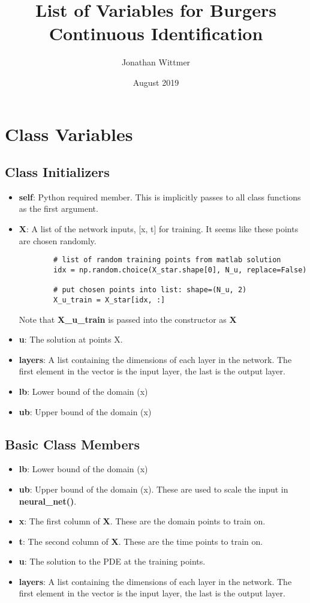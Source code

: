 \documentclass[10pt]{article}
\title{List of Variables for Burgers Continuous Identification}
\author{Jonathan Wittmer}
\date{August 2019}
\begin{document}
\maketitle

\section{Class Variables}
\subsection{Class Initializers}
\begin{itemize}
    \item \textbf{self}: Python required member. This is implicitly passes to all class functions as the first argument.
    \item \textbf{X}: A list of the network inputs, [x, t] for training. It seems like these points are chosen randomly.
    \begin{lstlisting}
        # list of random training points from matlab solution
        idx = np.random.choice(X_star.shape[0], N_u, replace=False)

        # put chosen points into list: shape=(N_u, 2)
        X_u_train = X_star[idx, :]
    \end{lstlisting}
    Note that \textbf{X\_u\_train} is passed into the constructor as \textbf{X}
    
	\item \textbf{u}: The solution at points X.
	\item \textbf{layers}: A list containing the dimensions of each layer in the network. The first element in the vector is the input layer, the last is the output layer. 
	\item \textbf{lb}: Lower bound of the domain (x)
	\item \textbf{ub}: Upper bound of the domain (x)
\end{itemize}


\subsection{Basic Class Members}

\begin{itemize}
	\item \textbf{lb}: Lower bound of the domain (x)
	\item \textbf{ub}: Upper bound of the domain (x). These are used to scale the input in \textbf{neural\_net()}.
	\item \textbf{x}: The first column of \textbf{X}. These are the domain points to train on.
	\item \textbf{t}: The second column of \textbf{X}. These are the time points to train on.
	\item \textbf{u}: The solution to the PDE at the training points.
	\item \textbf{layers}: A list containing the dimensions of each layer in the network. The first element in the vector is the input layer, the last is the output layer.
\end{itemize}
\end{document}
